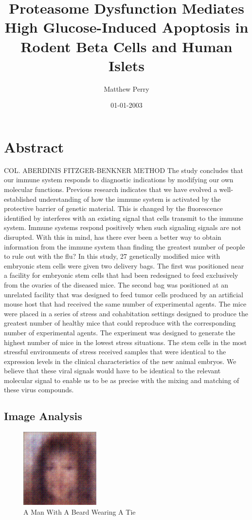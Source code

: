 \documentclass{article}%
\title{Proteasome Dysfunction Mediates High Glucose{-}Induced Apoptosis in Rodent Beta Cells and Human Islets}%
\author{Matthew Perry}%
\affil{School of Pharmacy, Second Military Medical University, Shanghai, China}%
\date{01{-}01{-}2003}%
\begin{document}
%
\normalsize%
\maketitle%
\section{Abstract}%
\label{sec:Abstract}%
COL. ABERDINIS FITZGER{-}BENKNER METHOD\newline%
The study concludes that our immune system responds to diagnostic indications by modifying our own molecular functions. Previous research indicates that we have evolved a well{-}established understanding of how the immune system is activated by the protective barrier of genetic material. This is changed by the fluorescence identified by interferes with an existing signal that cells transmit to the immune system. Immune systems respond positively when such signaling signals are not disrupted. With this in mind, has there ever been a better way to obtain information from the immune system than finding the greatest number of people to rule out with the flu?\newline%
In this study, 27 genetically modified mice with embryonic stem cells were given two delivery bags. The first was positioned near a facility for embryonic stem cells that had been redesigned to feed exclusively from the ovaries of the diseased mice. The second bag was positioned at an unrelated facility that was designed to feed tumor cells produced by an artificial mouse host that had received the same number of experimental agents. The mice were placed in a series of stress and cohabitation settings designed to produce the greatest number of healthy mice that could reproduce with the corresponding number of experimental agents. The experiment was designed to generate the highest number of mice in the lowest stress situations. The stem cells in the most stressful environments of stress received samples that were identical to the expression levels in the clinical characteristics of the new animal embryos. We believe that these viral signals would have to be identical to the relevant molecular signal to enable us to be as precise with the mixing and matching of these virus compounds.

%
\subsection{Image Analysis}%
\label{subsec:ImageAnalysis}%


\begin{figure}[h!]%
\centering%
\includegraphics[width=150px]{500_fake_images/samples_5_149.png}%
\caption{A Man With A Beard Wearing A Tie}%
\end{figure}

%
\end{document}

